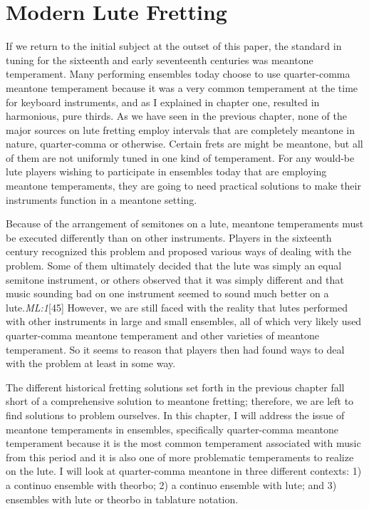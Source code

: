 \chapter{Modern Lute Fretting}

If we return to the initial subject at the outset of this paper, the standard in tuning
for the sixteenth and early seventeenth centuries was meantone temperament.  Many
performing ensembles today choose to use quarter-comma meantone temperament because it
was a very common temperament at the time for keyboard instruments, and as I explained
in chapter one, resulted in harmonious, pure thirds.  As we have seen in the previous
chapter, none of the major sources on lute fretting employ intervals that are
completely meantone in nature, quarter-comma or otherwise.  Certain frets are might be
meantone, but all of them are not uniformly tuned in one kind of temperament.  For any
would-be lute players wishing to participate in ensembles today that are employing
meantone temperaments, they are going to need practical solutions to make their
instruments function in a meantone setting.

Because of the arrangement of semitones on a lute, meantone temperaments must be
executed differently than on other instruments.  Players in the sixteenth century
recognized this problem and proposed various ways of dealing with the problem.  Some of
them ultimately decided that the lute was simply an equal semitone instrument, or
others observed that it was simply different and that music sounding bad on one
instrument seemed to sound much better on a lute.\textit{ML:1}[45]  However, we are
still faced with the reality that lutes performed with other instruments in large and
small ensembles, all of which very likely used quarter-comma meantone temperament and
other varieties of meantone temperament.  So it seems to reason that players then had
found ways to deal with the problem at least in some way.

The different historical fretting solutions set forth in the previous chapter fall
short of a comprehensive solution to meantone fretting; therefore, we are left to find
solutions to problem ourselves. In this chapter, I will address the
issue of meantone temperaments in ensembles, specifically quarter-comma
meantone temperament because it is the most common temperament associated with music
from this period and it is also one of more problematic temperaments to realize on the
lute. I will look at quarter-comma meantone in three different contexts: 1) a continuo
ensemble with theorbo; 2) a continuo ensemble with lute; and 3) ensembles with lute or
theorbo in tablature notation.

